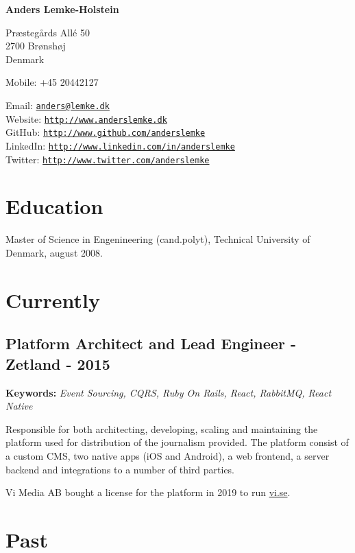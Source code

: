 \documentclass[a4paper]{article}
\newcommand{\keywords}[1]{\small\textbf{Keywords:} \emph{#1}\normalsize}
\begin{document}
{\huge\bf Anders Lemke-Holstein}

\bigskip
Præstegårds Allé 50 \\
2700 Brønshøj \\
Denmark

\medskip

Mobile: +45 20442127

\medskip

Email: \href{mailto:anders@lemke.dk}{\tt anders@lemke.dk} \\
Website: \href{http://www.anderslemke.dk}{\tt http://www.anderslemke.dk} \\
GitHub: \href{http://www.github.com/anderslemke}{\tt http://www.github.com/anderslemke} \\
LinkedIn: \href{http://www.linkedin.com/in/anderslemke}{\tt http://www.linkedin.com/in/anderslemke} \\
Twitter: \href{http://www.twitter.com/anderslemke}{\tt http://www.twitter.com/anderslemke} 

\section*{Education}
Master of Science in Engenineering (cand.polyt), Technical University of Denmark, august 2008.

\section*{Currently}

\subsection*{Platform Architect and Lead Engineer - Zetland - 2015}
\keywords{Event Sourcing, CQRS, Ruby On Rails, React, RabbitMQ, React Native}

Responsible for both architecting, developing, scaling and maintaining the platform used for distribution of the journalism provided. The platform consist of a custom CMS, two native apps (iOS and Android), a web frontend, a server backend and integrations to a number of third parties.

Vi Media AB bought a license for the platform in 2019 to run \href{https://vi.se}{vi.se}.

\section*{Past}
\end{document}
